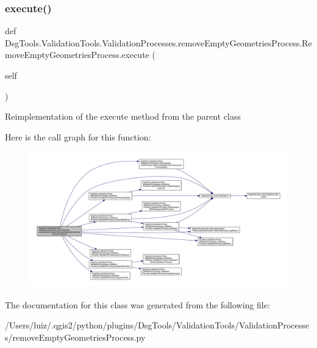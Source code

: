 \subsubsection{\texorpdfstring{execute()}{execute()}}
{\footnotesize\ttfamily def Dsg\+Tools.\+Validation\+Tools.\+Validation\+Processes.\+remove\+Empty\+Geometries\+Process.\+Remove\+Empty\+Geometries\+Process.\+execute (\begin{DoxyParamCaption}\item[{}]{self }\end{DoxyParamCaption})}

\begin{DoxyVerb}Reimplementation of the execute method from the parent class
\end{DoxyVerb}
 Here is the call graph for this function\+:
\nopagebreak
\begin{figure}[H]
\begin{center}
\leavevmode
\includegraphics[width=350pt]{class_dsg_tools_1_1_validation_tools_1_1_validation_processes_1_1remove_empty_geometries_process8df81d6329df1977586c69f5653d5861_a88b5bfc5ca71211f0baa89ebf10bc7e5_cgraph}
\end{center}
\end{figure}


The documentation for this class was generated from the following file\+:\begin{DoxyCompactItemize}
\item 
/\+Users/luiz/.\+qgis2/python/plugins/\+Dsg\+Tools/\+Validation\+Tools/\+Validation\+Processes/remove\+Empty\+Geometries\+Process.\+py\end{DoxyCompactItemize}
